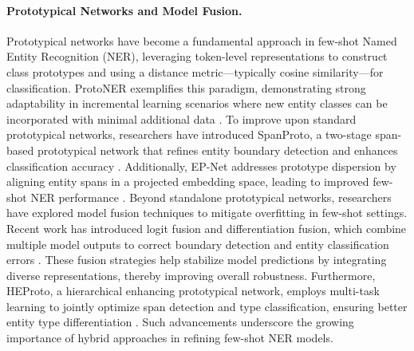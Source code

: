 \paragraph{Prototypical Networks and Model Fusion.}  
Prototypical networks have become a fundamental approach in few-shot Named Entity Recognition (NER), leveraging token-level representations to construct class prototypes and using a distance metric—typically cosine similarity—for classification. ProtoNER exemplifies this paradigm, demonstrating strong adaptability in incremental learning scenarios where new entity classes can be incorporated with minimal additional data \cite{Fritzler2018Few-shot}. To improve upon standard prototypical networks, researchers have introduced SpanProto, a two-stage span-based prototypical network that refines entity boundary detection and enhances classification accuracy \cite{Wang2022SpanProto}. Additionally, EP-Net addresses prototype dispersion by aligning entity spans in a projected embedding space, leading to improved few-shot NER performance \cite{Ji2022Few-shot}.
Beyond standalone prototypical networks, researchers have explored model fusion techniques to mitigate overfitting in few-shot settings. Recent work has introduced logit fusion and differentiation fusion, which combine multiple model outputs to correct boundary detection and entity classification errors \cite{gong2021few}. These fusion strategies help stabilize model predictions by integrating diverse representations, thereby improving overall robustness. Furthermore, HEProto, a hierarchical enhancing prototypical network, employs multi-task learning to jointly optimize span detection and type classification, ensuring better entity type differentiation \cite{Chen2023HEProto}. Such advancements underscore the growing importance of hybrid approaches in refining few-shot NER models.

